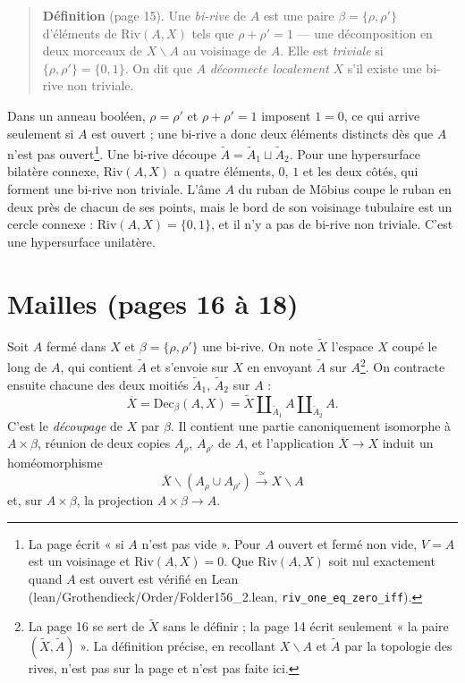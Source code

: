 \documentclass[11pt,a4paper]{article}
\begin{document}
\begin{quote}
\textbf{Définition} (page 15). Une \emph{bi-rive} de $A$ est une paire
$\beta = \{\rho, \rho'\}$ d'éléments de $\mathrm{Riv}(A,X)$ tels que
$\rho + \rho' = 1$ --- une décomposition en deux morceaux de $X \smallsetminus A$ au
voisinage de $A$. Elle est \emph{triviale} si $\{\rho, \rho'\} = \{0,1\}$. On dit que
$A$ \emph{déconnecte localement} $X$ s'il existe une bi-rive non triviale.
\end{quote}

Dans un anneau booléen, $\rho = \rho'$ et $\rho + \rho' = 1$ imposent $1 = 0$, ce
qui arrive seulement si $A$ est ouvert ; une bi-rive a donc deux éléments distincts
dès que $A$ n'est pas ouvert\footnote{La page écrit « si $A$ n'est pas vide ». Pour
$A$ ouvert et fermé non vide, $V = A$ est un voisinage et $\mathrm{Riv}(A,X) = 0$.
Que $\mathrm{Riv}(A, X)$ soit nul exactement quand $A$ est ouvert est vérifié en
Lean (lean/Grothendieck/Order/Folder156\_2.lean, \texttt{riv\_one\_eq\_zero\_iff}).}.
Une bi-rive découpe $\widetilde{A} = \widetilde{A}_{1} \sqcup \widetilde{A}_{2}$.
Pour une hypersurface bilatère connexe, $\mathrm{Riv}(A,X)$ a quatre éléments, $0$,
$1$ et les deux côtés, qui forment une bi-rive non triviale. L'âme $A$ du ruban de
Möbius coupe le ruban en deux près de chacun de ses points, mais le bord de son
voisinage tubulaire est un cercle connexe : $\mathrm{Riv}(A,X) = \{0,1\}$, et il n'y
a pas de bi-rive non triviale. C'est une hypersurface unilatère.

\section*{Mailles (pages 16 à 18)}

Soit $A$ fermé dans $X$ et $\beta = \{\rho, \rho'\}$ une bi-rive. On note
$\widetilde{X}$ l'espace $X$ coupé le long de $A$, qui contient $\widetilde{A}$ et
s'envoie sur $X$ en envoyant $\widetilde{A}$ sur $A$\footnote{La page 16 se sert de
$\widetilde{X}$ sans le définir ; la page 14 écrit seulement « la paire
$(\widetilde{X}, \widetilde{A})$ ». La définition précise, en recollant $X
\smallsetminus A$ et $\widetilde{A}$ par la topologie des rives, n'est pas sur la
page et n'est pas faite ici.}. On contracte ensuite chacune des deux moitiés
$\widetilde{A}_{1}$, $\widetilde{A}_{2}$ sur $A$ :
\[
\overline{X} = \mathrm{Dec}_{\beta}(A, X) = \widetilde{X}
\amalg_{\widetilde{A}_{1}} A \amalg_{\widetilde{A}_{2}} A .
\]
C'est le \emph{découpage} de $X$ par $\beta$. Il contient une partie canoniquement
isomorphe à $A \times \beta$, réunion de deux copies $A_{\rho}$, $A_{\rho'}$ de $A$,
et l'application $\overline{X} \to X$ induit un homéomorphisme
\[
\overline{X} \smallsetminus (A_{\rho} \cup A_{\rho'}) \xrightarrow{\ \simeq\ } X
\smallsetminus A
\]
et, sur $A \times \beta$, la projection $A \times \beta \to A$.
\end{document}
